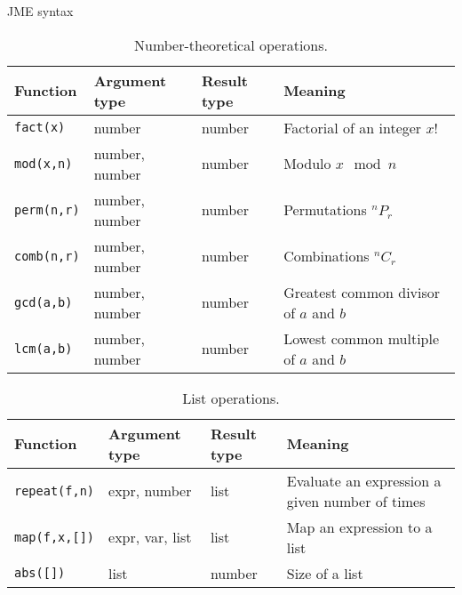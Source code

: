 \begin{chapter}{\label{cha:jme_syntax}JME syntax}
  \begin{sidewaystable}[ht]
  	\centering
  	\begin{tabular}{llll}
    	\hline
  		Function & Argument type & Result type & Meaning \\
  		\hline
		  \verb"fact(x)" & number & number & Factorial of an integer $x!$ \\
      \verb"mod(x,n)" & number, number & number & Modulo $x\mod{n}$ \\
      \verb"perm(n,r)" & number, number & number & Permutations $^{n}P_{r}$ \\
      \verb"comb(n,r)" & number, number & number & Combinations $^{n}C_{r}$ \\
  		\verb"gcd(a,b)" & number, number & number & Greatest common divisor of $a$
      and $b$ \\
  		\verb"lcm(a,b)"	& number, number & number & Lowest common multiple of $a$
      and $b$ \\
  	\end{tabular}
  	\caption{\label{tab:numbertheoryfunctions}
  		Number-theoretical operations.
  	}
  \end{sidewaystable}

  \begin{sidewaystable}[ht]
  	\centering
    \begin{tabular}{lllp{20em}}
    	\hline
  		Function & Argument type & Result type & Meaning \\
  		\hline
		  \verb"repeat(f,n)" & expr, number & list & Evaluate an expression a
      given number of times \\
      \verb"map(f,x,[])" & expr, var, list & list & Map an expression to a list
      \\
      \verb"abs([])" & list & number & Size of a list \\
  	\end{tabular}
  	\caption{\label{tab:listfunctions}
  		List operations.
  	}
  \end{sidewaystable}


\end{chapter}

